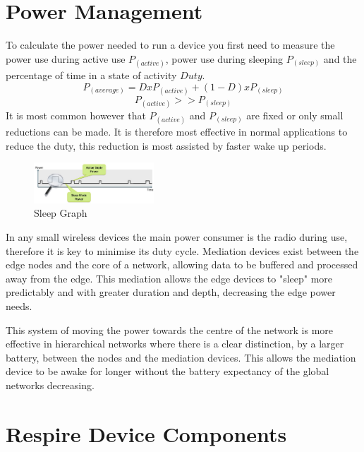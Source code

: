 \section{Power Management}
To calculate the power needed to run a device you first need to measure the power use during
active use \(P_(active)\), power use during sleeping \(P_(sleep)\) and the percentage of time in a state of
activity \(Duty\).
\[
  P_(average) = D x P_(active) + (1-D) x P_(sleep)
\]
\[
  P_(active) >> P_(sleep)
\]
It is most common however that \(P_(active)\) and \(P_(sleep)\) are fixed or only small reductions can be
made. It is therefore most effective in normal applications to reduce the duty, this reduction is most
assisted by faster wake up periods.


\begin{figure}
  \vspace{-10pt}
  \begin{center}
    \includegraphics[width=0.4\textwidth, keepaspectratio=true]{images/lowenergysystemsoverview_croped.jpg}
  \end{center}
  \caption[Sleep Graph]{Sleep Graph \cite{EFM32Tech}}
  \vspace{-10pt}
\end{figure}

In any small wireless devices the main power consumer is the radio during use, therefore it is key to
minimise its duty cycle. Mediation devices exist between the edge nodes and the core of a network,
allowing data to be buffered and processed away from the edge. This mediation allows the edge
devices to "sleep" more predictably and with greater duration and depth, decreasing the edge
power needs\cite{Edgar2003}. %


This system of moving the power towards the centre of the network is more effective in hierarchical networks
where there is a clear distinction, \eg by a larger battery, between the nodes
and the mediation devices. This allows the mediation device to be awake for
longer without the battery expectancy of the global networks decreasing.

\section{Respire Device Components}

